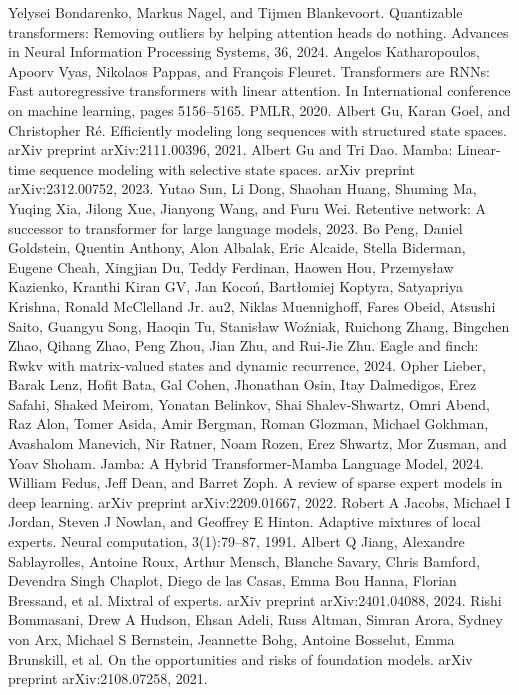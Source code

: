 \begin{chapterreferences}
 Yelysei Bondarenko, Markus Nagel, and Tijmen Blankevoort. Quantizable transformers: Removing outliers by helping attention heads do nothing. Advances in Neural Information Processing Systems, 36, 2024.
 Angelos Katharopoulos, Apoorv Vyas, Nikolaos Pappas, and François Fleuret. Transformers are RNNs: Fast autoregressive transformers with linear attention. In International conference on machine learning, pages 5156–5165. PMLR, 2020.
 Albert Gu, Karan Goel, and Christopher Ré. Efficiently modeling long sequences with structured state spaces. arXiv preprint arXiv:2111.00396, 2021.
 Albert Gu and Tri Dao. Mamba: Linear-time sequence modeling with selective state spaces. arXiv preprint arXiv:2312.00752, 2023.
 Yutao Sun, Li Dong, Shaohan Huang, Shuming Ma, Yuqing Xia, Jilong Xue, Jianyong Wang, and Furu Wei. Retentive network: A successor to transformer for large language models, 2023.
 Bo Peng, Daniel Goldstein, Quentin Anthony, Alon Albalak, Eric Alcaide, Stella Biderman, Eugene Cheah, Xingjian Du, Teddy Ferdinan, Haowen Hou, Przemysław Kazienko, Kranthi Kiran GV, Jan Kocoń, Bartłomiej Koptyra, Satyapriya Krishna, Ronald McClelland Jr. au2, Niklas Muennighoff, Fares Obeid, Atsushi Saito, Guangyu Song, Haoqin Tu, Stanisław Woźniak, Ruichong Zhang, Bingchen Zhao, Qihang Zhao, Peng Zhou, Jian Zhu, and Rui-Jie Zhu. Eagle and finch: Rwkv with matrix-valued states and dynamic recurrence, 2024.
 Opher Lieber, Barak Lenz, Hofit Bata, Gal Cohen, Jhonathan Osin, Itay Dalmedigos, Erez Safahi, Shaked Meirom, Yonatan Belinkov, Shai Shalev-Shwartz, Omri Abend, Raz Alon, Tomer Asida, Amir Bergman, Roman Glozman, Michael Gokhman, Avashalom Manevich, Nir Ratner, Noam Rozen, Erez Shwartz, Mor Zusman, and Yoav Shoham. Jamba: A Hybrid Transformer-Mamba Language Model, 2024.
 William Fedus, Jeff Dean, and Barret Zoph. A review of sparse expert models in deep learning. arXiv preprint arXiv:2209.01667, 2022.
 Robert A Jacobs, Michael I Jordan, Steven J Nowlan, and Geoffrey E Hinton. Adaptive mixtures of local experts. Neural computation, 3(1):79–87, 1991.
 Albert Q Jiang, Alexandre Sablayrolles, Antoine Roux, Arthur Mensch, Blanche Savary, Chris Bamford, Devendra Singh Chaplot, Diego de las Casas, Emma Bou Hanna, Florian Bressand, et al. Mixtral of experts. arXiv preprint arXiv:2401.04088, 2024.
 Rishi Bommasani, Drew A Hudson, Ehsan Adeli, Russ Altman, Simran Arora, Sydney von Arx, Michael S Bernstein, Jeannette Bohg, Antoine Bosselut, Emma Brunskill, et al. On the opportunities and risks of foundation models. arXiv preprint arXiv:2108.07258, 2021.

\end{chapterreferences}
